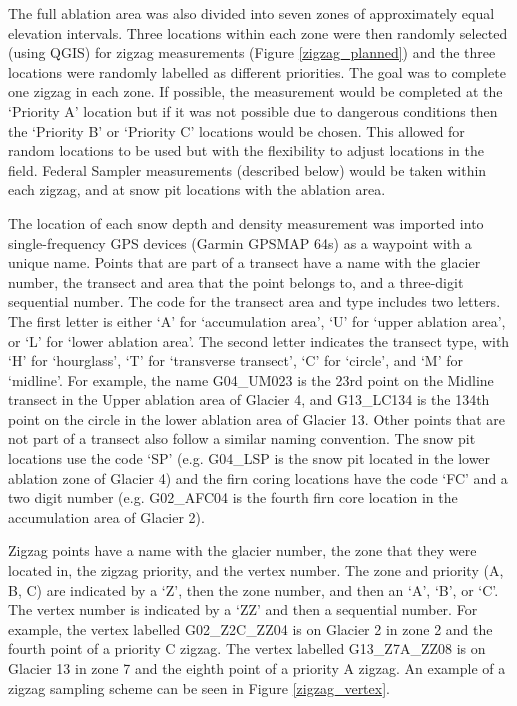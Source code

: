 \documentclass{sfuthesis}
\begin{document}
The full ablation area was also divided into seven zones of approximately equal elevation intervals. Three locations within each zone were then randomly selected (using QGIS) for zigzag \citep{Shea2010} measurements (Figure \ref{zigzag_planned}) and the three locations were randomly labelled as different priorities. The goal was to complete one zigzag in each zone. If possible, the measurement would be completed at the `Priority A' location but if it was not possible due to dangerous conditions then the `Priority B' or `Priority C' locations would be chosen. This allowed for random locations to be used but with the flexibility to adjust locations in the field. Federal Sampler measurements (described below) would be taken within each zigzag, and at snow pit locations with the ablation area.  

The location of each snow depth and density measurement was imported into single-frequency GPS devices (Garmin GPSMAP 64s) as a waypoint with a unique name. Points that are part of a transect have a name with the glacier number, the transect and area that the point belongs to, and a three-digit sequential number. The code for the transect area and type includes two letters. The first letter is either `A' for `accumulation area', `U' for `upper ablation area', or `L' for `lower ablation area'. The second letter indicates the transect type, with `H' for `hourglass', `T' for `transverse transect', `C' for `circle', and `M' for `midline'. For example, the name G04\_UM023 is the 23rd point on the Midline transect in the Upper ablation area of Glacier 4, and G13\_LC134 is the 134th point on the circle in the lower ablation area of Glacier 13. Other points that are not part of a transect also follow a similar naming convention. The snow pit locations use the code `SP' (e.g. G04\_LSP is the snow pit located in the lower ablation zone of Glacier 4) and the firn coring locations have the code `FC' and a two digit number (e.g. G02\_AFC04 is the fourth firn core location in the accumulation area of Glacier 2).

Zigzag points have a name with the glacier number, the zone that they were located in, the zigzag priority, and the vertex number. The zone and priority (A, B, C) are indicated by a `Z', then the zone number, and then an `A', `B', or `C'. The vertex number is indicated by a `ZZ' and then a sequential number. For example, the vertex labelled G02\_Z2C\_ZZ04 is on Glacier 2 in zone 2 and the fourth point of a priority C zigzag. The vertex labelled G13\_Z7A\_ZZ08 is on Glacier 13 in zone 7 and the eighth point of a priority A zigzag. An example of a zigzag sampling scheme can be seen in Figure \ref{zigzag_vertex}.
\end{document}
